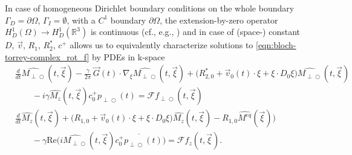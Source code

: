 \documentclass{ws-m3as}
\newcommand{\kspace}[1]{{#1}}
\renewcommand\Re{\mathrm{Re}}
\def\Mpp{M_{\perp\!\!\!\!\!\bigcirc}}
\def\Mphp{\widehat{\Mpp}}
\def\pp{p_{\perp\!\!\!\!\!\bigcirc}}
\def\fpp{f_{\perp\!\!\!\!\!\bigcirc}}
\begin{document}
\kspace{
\begin{remark}\label{rem:transform_kspace} %
In case of homogeneous Dirichlet boundary conditions on the whole boundary $\Gamma_D=\partial\Omega$, $\Gamma_I=\emptyset$, with a $C^1$ boundary $\partial\Omega$, the extension-by-zero operator $H^1_D(\Omega)\to H^1_D(\mathbb{R}^3)$ is continuous (cf., e.g., \cite{BrezziFortin}) and in case of (space-) constant $D$, $\vec v$, $R_1$, $R_2^*$, $c^+$ allows us to equivalently characterize solutions to \eqref{eqn:bloch-torrey-complex_rot_f} by PDEs in k-space
\begin{equation}\label{eqn:bloch-torrey-complex_rot_FT_f}
\begin{aligned}
&\frac{d}{dt}\Mphp(t,\vec\xi) - \frac{\gamma}{2\pi}\,\vec G(t)\cdot \nabla_\xi \Mphp(t,\vec\xi)
+\bigl(R_{2,0}^*+\vec v_0(t)\cdot\xi+\xi\cdot D_0\xi \bigr)\Mphp(t,\vec\xi)\\
&\qquad-i\gamma \widehat{M_z}(t, \vec\xi)c^+_0 \pp(t)=\mathcal{F}\fpp(t, \vec\xi)\\    
&\frac{d}{dt}\widehat{M_z}(t, \vec\xi) 
+\bigl(R_{1,0}+\vec v_0(t)\cdot\xi+\xi\cdot D_0\xi\bigr)\widehat{M_z}(t, \vec\xi)-R_{1,0}\widehat{M^{eq}}(\vec\xi))\\
&\qquad-\gamma\Re\bigl(i\Mphp(t, \vec\xi)\overline{c^+_0 \pp(t)}\bigr)=\mathcal{F}f_z(t, \vec\xi).
\end{aligned}
\end{equation}
\end{remark}
}

\end{document}
